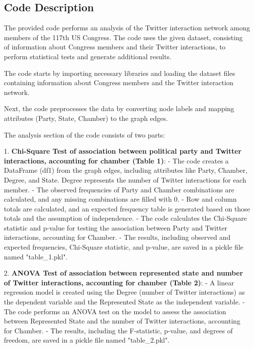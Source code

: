 \documentclass[11pt]{article}
\begin{document}
\subsection{Code Description}

The provided code performs an analysis of the Twitter interaction network among members of the 117th US Congress. The code uses the given dataset, consisting of information about Congress members and their Twitter interactions, to perform statistical tests and generate additional results.

The code starts by importing necessary libraries and loading the dataset files containing information about Congress members and the Twitter interaction network.

Next, the code preprocesses the data by converting node labels and mapping attributes (Party, State, Chamber) to the graph edges.

The analysis section of the code consists of two parts:

1. \textbf{Chi-Square Test of association between political party and Twitter interactions, accounting for chamber (Table 1)}:
   - The code creates a DataFrame (df1) from the graph edges, including attributes like Party, Chamber, Degree, and State. Degree represents the number of Twitter interactions for each member.
   - The observed frequencies of Party and Chamber combinations are calculated, and any missing combinations are filled with 0.
   - Row and column totals are calculated, and an expected frequency table is generated based on those totals and the assumption of independence.
   - The code calculates the Chi-Square statistic and p-value for testing the association between Party and Twitter interactions, accounting for Chamber.
   - The results, including observed and expected frequencies, Chi-Square statistic, and p-value, are saved in a pickle file named "table\_1.pkl".

2. \textbf{ANOVA Test of association between represented state and number of Twitter interactions, accounting for chamber (Table 2)}:
   - A linear regression model is created using the Degree (number of Twitter interactions) as the dependent variable and the Represented State as the independent variable.
   - The code performs an ANOVA test on the model to assess the association between Represented State and the number of Twitter interactions, accounting for Chamber.
   - The results, including the F-statistic, p-value, and degrees of freedom, are saved in a pickle file named "table\_2.pkl".
\end{document}
